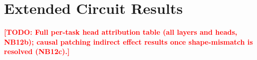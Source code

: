 \documentclass[11pt]{article}
\newcommand{\todo}[1]{\textcolor{red}{\textbf{[TODO: #1]}}}
\begin{document}
\section{Extended Circuit Results}
\label{sec:appendix_circuits}

\todo{Full per-task head attribution table (all layers and heads, NB12b); causal
patching indirect effect results once shape-mismatch is resolved (NB12c).}
\end{document}
